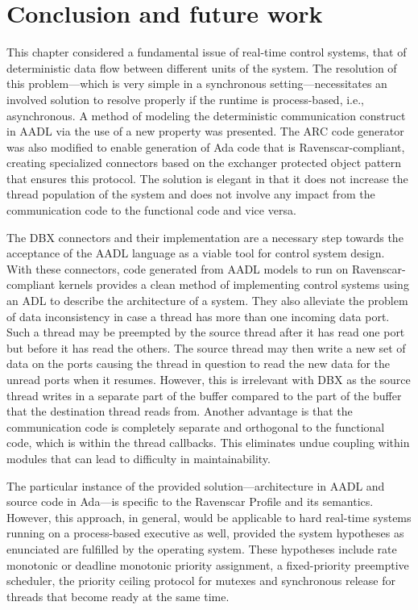 \newpage
\section{Conclusion and future work}
This chapter considered a fundamental issue of real-time control
systems, that of deterministic data flow between different units of
the system. The resolution of this problem---which is very simple in a
synchronous setting---necessitates an involved solution to resolve
properly if the runtime is process-based, i.e., asynchronous. A method
of modeling the deterministic communication construct in AADL via the
use of a new property was presented. The ARC code generator was also
modified to enable generation of Ada code that is Ravenscar-compliant,
creating specialized connectors based on the exchanger protected
object pattern that ensures this protocol. The solution is elegant in
that it does not increase the thread population of the system and does
not involve any impact from the communication code to the functional
code and vice versa.

The DBX connectors and their implementation are a necessary step
towards the acceptance of the AADL language as a viable tool for
control system design. With these connectors, code generated from AADL
models to run on Ravenscar-compliant kernels provides a clean method
of implementing control systems using an ADL to describe the
architecture of a system. They also alleviate the problem of data
inconsistency in case a thread has more than one incoming data
port. Such a thread may be preempted by the source thread after it has
read one port but before it has read the others. The source thread may
then write a new set of data on the ports causing the thread in
question to read the new data for the unread ports when it
resumes. However, this is irrelevant with DBX as the source thread
writes in a separate part of the buffer compared to the part of the
buffer that the destination thread reads from. Another advantage is
that the communication code is completely separate and orthogonal to
the functional code, which is within the thread callbacks. This
eliminates undue coupling within modules that can lead to difficulty
in maintainability.

The particular instance of the provided solution---architecture in
AADL and source code in Ada---is specific to the Ravenscar Profile and
its semantics. However, this approach, in general, would be applicable
to hard real-time systems running on a process-based executive as
well, provided the system hypotheses as enunciated are fulfilled by
the operating system. These hypotheses include rate monotonic or
deadline monotonic priority assignment, a fixed-priority preemptive
scheduler, the priority ceiling protocol for mutexes and synchronous
release for threads that become ready at the same time.

